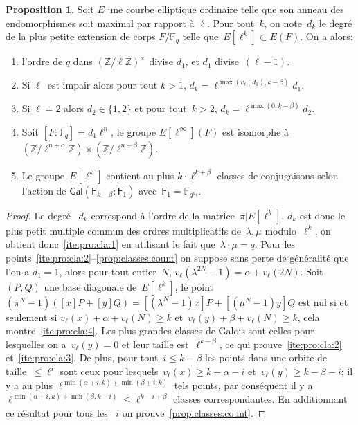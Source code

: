 \documentclass[10pt,a4paper]{book}
\theoremstyle{plain}
\theoremstyle{definition}
\theoremstyle{definition}
\theoremstyle{definition}
\theoremstyle{definition}
\newtheorem{prop}[thm]{Proposition}
\theoremstyle{definition}
\theoremstyle{remark}
\theoremstyle{remark}
\theoremstyle{definition}
\begin{document}
\begin{prop}\label{pro:clas:fro}
Soit $E$ une courbe elliptique ordinaire telle que son anneau des endomorphismes 
soit maximal par rapport à $\ell$. Pour tout~$k$, on note~$d_k$ le degré de la 
plus petite extension de corps $F/\mathbb{F}_q$ telle que~$E[\ell^k]\subset 
E(F)$. On  a alors:
\begin{enumerate}
\item \label{ite:pro:cla:1} l'ordre de $q$ dans $(\mathbb{Z}/ \ell \mathbb{Z})^\times$ divise $d_1$,
et $d_1$ divise~$(\ell-1)$.
\item \label{ite:pro:cla:2} Si $\ell$~est impair alors pour tout $k > 1$,
$ d_k = \ell^{\max (v_{\ell} (d_1), k - \beta)}d_1$.
\item \label{ite:pro:cla:3} Si $\ell=2$ alors $d_2 \in \{1,2\}$ et pour tout~$k > 2$,
$d_k = \ell^{\max (0, k - \beta)}d_2$.
\item \label{ite:pro:cla:4} Soit $[F:\mathbb{F}_q]=d_1\ell^n$, le groupe $E[\ell^{\infty}](F)$ est isomorphe à~$(\mathbb{Z}/\ell^{n+\alpha} \mathbb{Z}) \times (\mathbb{Z}/\ell^{n+\beta} \mathbb{Z})$.
\item\label{prop:classes:count} Le groupe~$E[\ell^k]$ contient au plus
$k \cdot \ell^{k+\beta}$ classes de conjugaisons selon l'action de $\mathsf{Gal}(\mathsf{F}_{k-\beta}:\mathsf{F}_1)$ avec~$\mathsf{F}_1 = \mathbb{F}_{q^{d_1}}$.
\end{enumerate}
\end{prop}


\begin{proof}
Le degré ~$d_k$ correspond à l'ordre de la matrice~$\pi|E[\ell^k]$.
$d_k$ est donc le plus petit multiple commun des ordres multiplicatifs
de~$\lambda, \mu$ modulo~$\ell^k$,
on obtient donc~\eqref{ite:pro:cla:1} en utilisant le fait que~$\lambda \cdot \mu = q$.
Pour les points~\eqref{ite:pro:cla:2}--\eqref{prop:classes:count} on suppose sans perte de généralité que l'on a $d_1 = 1$,
alors pour tout entier~$N$, $v_{\ell}(\lambda^{2N}-1) = \alpha + v_{\ell} (2N)$.
Soit~$(P, Q)$ une base diagonale de~$E[\ell^k]$,
le point $(\pi^N - 1) ([x] P + [y] Q) = [(\lambda^N-1) x] P + [(\mu^N-1) y] Q$
est nul si et seulement si $v_{\ell} (x) + \alpha + v_{\ell} (N) \geq k$
et~$v_{\ell} (y) + \beta + v_{\ell} (N) \geq k$, cela montre~\eqref{ite:pro:cla:4}.
Les plus grandes classes de Galois sont celles pour lesquelles
on a~$v_{\ell} (y) = 0$ et leur taille est~$\ell^{k - \beta}$,
ce qui prouve~\eqref{ite:pro:cla:2} et~\eqref{ite:pro:cla:3}.
De plus, pour tout~$i \leq k-\beta$ les points dans une orbite de taille~$\leqslant \ell^i$
sont ceux pour lesquels~$v_{\ell} (x) \geqslant k - \alpha - i$ et~$v_{\ell} (y) \geqslant k - \beta - i$;
il y a au plus $\ell^{\min(\alpha+i, k) + \min (\beta+i, k)}$ tels points,
par conséquent il y a $\ell^{\min(\alpha+i, k) + \min(\beta, k-i)} \leqslant \ell^{k-i+\beta}$
 classes correspondantes.
En additionnant ce résultat pour tous les ~$i$ on prouve~\eqref{prop:classes:count}.
\end{proof}
\end{document}

